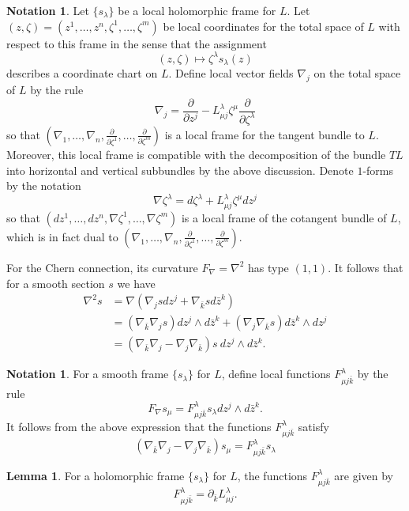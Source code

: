 \documentclass{article}
\numberwithin{equation}{section}
\theoremstyle{definition}
\newtheorem{notation}[definition]{Notation}
\theoremstyle{theorem}
\newtheorem{lemma}[definition]{Lemma}
\begin{document}
\begin{notation}
Let $\{s_\lambda\}$ be a local holomorphic frame for $L$. Let $(z, \zeta) = (z^1, \ldots, z^n, \zeta^1, \ldots, \zeta^m)$ be local coordinates for the total space of $L$ with respect to this frame in the sense that the assignment 
\[
(z, \zeta) \mapsto \zeta^\lambda s_\lambda(z)
\]
describes a coordinate chart on $L$. 
Define local vector fields $\nabla_j$ on the total space of $L$ by the rule 
\[
\nabla_j = \frac{\partial}{\partial z^j} - L^{\lambda}_{\mu j} \zeta^\mu \frac{\partial}{\partial \zeta^\lambda}
\]
so that $(\nabla_1, \ldots, \nabla_n, \frac{\partial}{\partial \zeta^1}, \ldots, \frac{\partial}{\partial \zeta^m})$ is a local frame for the tangent bundle to $L$. Moreover, this local frame is compatible with the decomposition of the bundle $TL$ into horizontal and vertical subbundles by the above discussion. 
Denote $1$-forms by the notation 
\[
\nabla \zeta^\lambda = d\zeta^\lambda + L^{\lambda}_{\mu j} \zeta^\mu dz^j 
\]
so that $(dz^1, \ldots, dz^n, \nabla \zeta^1, \ldots, \nabla \zeta^m)$ is a local frame of the cotangent bundle of $L$, which is in fact dual to $(\nabla_1, \ldots, \nabla_n, \frac{\partial}{\partial \zeta^1}, \ldots, \frac{\partial}{\partial \zeta^m})$. 
\end{notation}



For the Chern connection, its curvature $F_\nabla = \nabla^2$ has type $(1,1)$. It follows that for a smooth section $s$ we have  
\begin{align*}
\nabla^2 s &= \nabla (\nabla_j s dz^j + \nabla_{\bar{k}}s d\bar{z}^k) \\
&= (\nabla_{\bar{k}} \nabla_j s )dz^j \wedge d\bar{z}^k + (\nabla_j \nabla_{\bar{k}} s) d\bar{z}^k \wedge dz^j \\
&= (\nabla_{\bar{k}}\nabla_j - \nabla_{j}\nabla_{\bar{k}})s \: dz^j \wedge d\bar{z}^k. 
\end{align*}

\begin{notation}
For a smooth frame $\{s_\lambda\}$ for $L$, define local functions $F^{\lambda}_{\mu j \bar{k}}$ by the rule 
\[
F_{\nabla} s_{\mu} = F^{\lambda}_{\mu j \bar{k}} s_\lambda dz^j \wedge d\bar{z}^k.
\]
It follows from the above expression that the functions $F^{\lambda}_{\mu j\bar{k}}$ satisfy 
\[
 (\nabla_{\bar{k}}\nabla_j - \nabla_{j}\nabla_{\bar{k}})s_\mu = F^{\lambda}_{\mu j\bar{k}} s_{\lambda} 
\]
\end{notation}

\begin{lemma}
For a holomorphic frame $\{s_\lambda\}$ for $L$, the functions $F^{\lambda}_{\mu j \bar{k}}$ are given by 
\[
F^{\lambda}_{\mu j \bar{k}} = \partial_{\bar{k}} L^{\lambda}_{\mu j}.
\]
\end{lemma}
\end{document}
